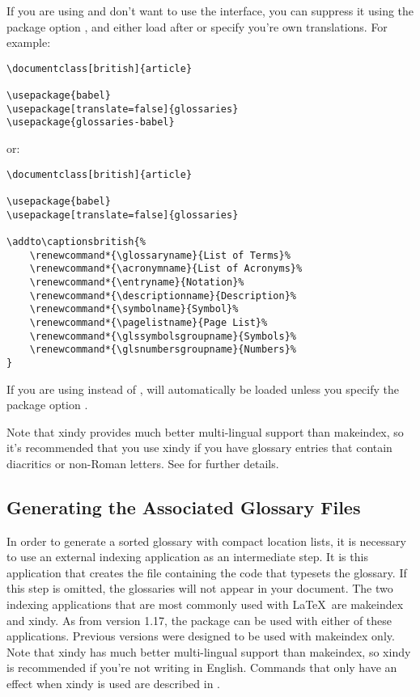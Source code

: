 \documentclass{nlctdoc}
\begin{document}
If you are using  and don't want to use the
 interface, you can suppress it using the package
option , and either load
 after  or specify you're own
translations. For example:
\begin{verbatim}
\documentclass[british]{article}

\usepackage{babel}
\usepackage[translate=false]{glossaries}
\usepackage{glossaries-babel}
\end{verbatim}
or:
\begin{verbatim}
\documentclass[british]{article}

\usepackage{babel}
\usepackage[translate=false]{glossaries}

\addto\captionsbritish{%
    \renewcommand*{\glossaryname}{List of Terms}%
    \renewcommand*{\acronymname}{List of Acronyms}%
    \renewcommand*{\entryname}{Notation}%
    \renewcommand*{\descriptionname}{Description}%
    \renewcommand*{\symbolname}{Symbol}%
    \renewcommand*{\pagelistname}{Page List}%
    \renewcommand*{\glssymbolsgroupname}{Symbols}%
    \renewcommand*{\glsnumbersgroupname}{Numbers}%
}
\end{verbatim}

If you are using  instead of , 
 will automatically be loaded unless
you specify the package option .

Note that \gls{xindy} provides much better multi-lingual support
than \gls{makeindex}, so it's recommended that you use \gls*{xindy}
if you have glossary entries that contain diacritics or
non-Roman letters. See  for further
details.

\subsection{Generating the Associated Glossary Files}
\label{sec:makeglossaries}

In order to generate a sorted glossary with compact location lists,
it is necessary to use an external indexing application as an
intermediate step. It is this application that creates the file
containing the code that typesets the glossary. If this step is
omitted, the glossaries will not appear in your document. The two
indexing applications that are most commonly used with \LaTeX\ are
\gls{makeindex} and \gls{xindy}. As from version 1.17, the
 package can be used with either of these
applications. Previous versions were designed to be used with
\gls*{makeindex} only. Note that \gls*{xindy} has much better
multi-lingual support than \gls*{makeindex}, so \gls*{xindy} is
recommended if you're not writing in English. Commands that only
have an effect when \gls*{xindy} is used are described in
.
\end{document}
